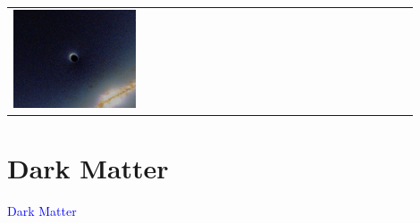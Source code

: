 \documentclass[compress]{beamer}
\begin{document}
\begin{frame}
\begin{tabular}{p{0.3\linewidth} p{0.3\linewidth} p{0.3\linewidth}}
\includegraphics[width=\linewidth]{pictures/black_hole_lensing9.png}
\end{tabular}
\end{frame}

\section*{Dark Matter}
\begin{frame}
\begin{center}
\Huge \textcolor{blue}{Dark Matter}
\end{center}
\end{frame}
\end{document}
